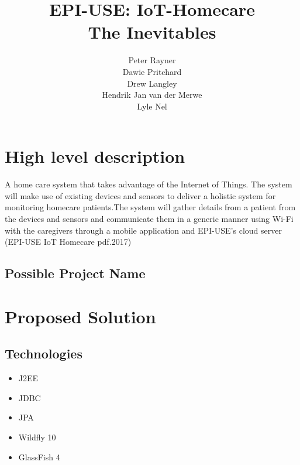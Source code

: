 \documentclass{article}
\title{EPI-USE: IoT-Homecare \\
The Inevitables
}
\author{  
            Peter Rayner\\
            Dawie Pritchard\\
            Drew Langley\\
            Hendrik Jan van der Merwe\\
            Lyle Nel\\
        }
\begin{document}
\maketitle

\newpage

\tableofcontents

\newpage


\section{High level description}
A home care system that takes advantage of the Internet of Things. The system will make use of existing devices and sensors to deliver a holistic system for monitoring homecare patients.The system will gather details from a patient from the devices and sensors and communicate them in a generic manner using Wi-Fi with the caregivers through a mobile application and EPI-USE's cloud server (EPI-USE IoT Homecare pdf.2017) 

\subsection{Possible Project Name}

\section{Proposed Solution}

\subsection{Technologies}
\begin{itemize}
	\item J2EE
	\item JDBC
	\item JPA
	\item Wildfly 10
	\item GlassFish 4
\end{itemize}
\end{document}
